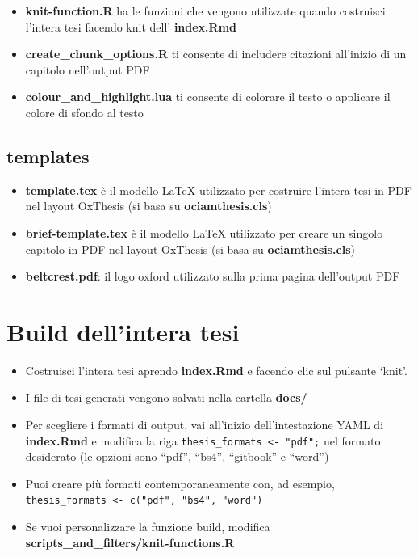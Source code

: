 \documentclass[a4paper, 11pt, nobind]{templates/ociamthesis}
\providecommand{\tightlist}{%
  \setlength{\itemsep}{0pt}\setlength{\parskip}{0pt}}
\begin{document}
\begin{itemize}
\item
  \textbf{knit-function.R} ha le funzioni che vengono utilizzate quando costruisci l'intera tesi facendo knit dell' \textbf{index.Rmd}
\item
  \textbf{create\_chunk\_options.R} ti consente di includere citazioni all'inizio di un capitolo nell'output PDF
\item
  \textbf{colour\_and\_highlight.lua} ti consente di colorare il testo o applicare il colore di sfondo al testo
\end{itemize}

\hypertarget{templates}{%
\subsection{\texorpdfstring{\textbf{templates}}{templates}}\label{templates}}

\begin{itemize}
\item
  \textbf{template.tex} è il modello LaTeX utilizzato per costruire l'intera tesi in PDF nel layout OxThesis (si basa su \textbf{ociamthesis.cls})
\item
  \textbf{brief-template.tex} è il modello LaTeX utilizzato per creare un singolo capitolo in PDF nel layout OxThesis (si basa su \textbf{ociamthesis.cls})
\item
  \textbf{beltcrest.pdf}: il logo oxford utilizzato sulla prima pagina dell'output PDF
\end{itemize}

\hypertarget{build-dellintera-tesi}{%
\section{Build dell'intera tesi}\label{build-dellintera-tesi}}

\begin{itemize}
\tightlist
\item
  Costruisci l'intera tesi aprendo \textbf{index.Rmd} e facendo clic sul pulsante `knit'.
\item
  I file di tesi generati vengono salvati nella cartella \textbf{docs/}
\item
  Per scegliere i formati di output, vai all'inizio dell'intestazione YAML di \textbf{index.Rmd} e modifica la riga \texttt{thesis\_formats\ \textless{}-\ "pdf";} nel formato desiderato (le opzioni sono ``pdf'', ``bs4'', ``gitbook'' e ``word'')
\item
  Puoi creare più formati contemporaneamente con, ad esempio, \texttt{thesis\_formats\ \textless{}-\ c("pdf",\ "bs4",\ "word")}
\item
  Se vuoi personalizzare la funzione build, modifica \textbf{scripts\_and\_filters/knit-functions.R}
\end{itemize}
\end{document}
